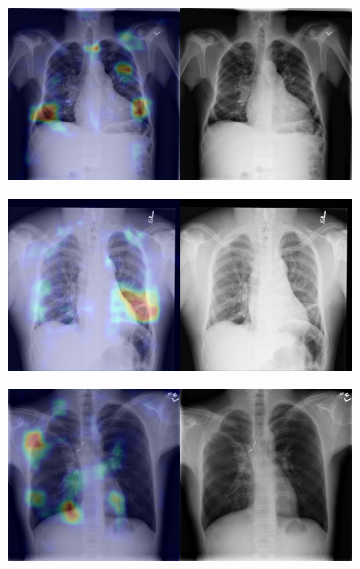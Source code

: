 \begin{figure}[b]
\begin{subfigure}{0.4\textwidth}
    \end{subfigure}
    \begin{subfigure}{0.4\textwidth}
        \centering
        \includegraphics[width=1.0\textwidth]{Chapters/5. Conclusiones/img/Fibrosis/1_1_00004533_001.png}
    \end{subfigure}
    \begin{subfigure}{0.4\textwidth}
        \centering
        \includegraphics[width=1.0\textwidth]{Chapters/5. Conclusiones/img/Fibrosis/1_1_00004822_017.png}
    \end{subfigure}
    \begin{subfigure}{0.4\textwidth}
        \centering
        \includegraphics[width=1.0\textwidth]{Chapters/5. Conclusiones/img/Fibrosis/1_1_00011460_074.png}

\end{subfigure}
\end{figure}
